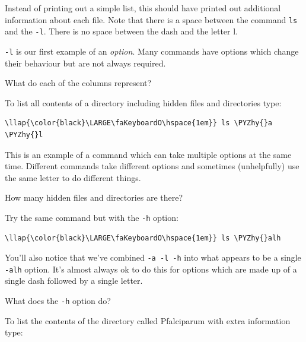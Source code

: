 \documentclass[11pt]{article}
\def\PYZhy{\char`\-}
\begin{document}
    Instead of printing out a simple list, this should have printed out
additional information about each file. Note that there is a space
between the command \texttt{ls} and the \texttt{-l}. There is no space
between the dash and the letter l.

\texttt{-l} is our first example of an \textit{option}. Many commands have
options which change their behaviour but are not always required.

What do each of the columns represent?

    To list all contents of a directory including hidden files and
directories type:

\begin{terminalinput}
\begin{Verbatim}[commandchars=\\\{\}]
\llap{\color{black}\LARGE\faKeyboardO\hspace{1em}} ls \PYZhy{}a \PYZhy{}l
\end{Verbatim}
\end{terminalinput}

    This is an example of a command which can take multiple options at the
same time. Different commands take different options and sometimes
(unhelpfully) use the same letter to do different things.

How many hidden files and directories are there?

    Try the same command but with the \texttt{-h} option:

\begin{terminalinput}
\begin{Verbatim}[commandchars=\\\{\}]
\llap{\color{black}\LARGE\faKeyboardO\hspace{1em}} ls \PYZhy{}alh
\end{Verbatim}
\end{terminalinput}

    You'll also notice that we've combined \texttt{-a\ -l\ -h} into what
appears to be a single \texttt{-alh} option. It's almost always ok to do
this for options which are made up of a single dash followed by a single
letter.

What does the \texttt{-h} option do?



\newpage



    To list the contents of the directory called Pfalciparum with extra
information type:
\end{document}
